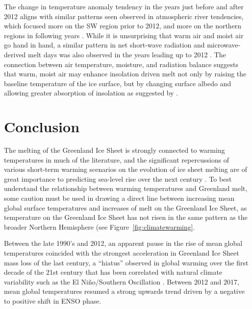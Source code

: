 \documentclass[11pt]{report}
\begin{document}
The change in temperature anomaly tendency in the years just before and after 2012 aligns with similar patterns seen observed in atmospheric river tendencies, which focused more on the SW region prior to 2012, and more on the northern regions in following years \cite[][]{mattingly2018}. While it is unsurprising that warm air and moist air go hand in hand, a similar pattern in net short-wave radiation and microwave-derived melt days was also observed in the years leading up to 2012 \cite[][]{angelen2014}. The connection between air temperature, moisture, and radiation balance suggests that warm, moist air may enhance insolation driven melt not only by raising the baseline temperature of the ice surface, but by changing surface albedo and allowing greater absorption of insolation as suggested by \cite[][]{box2012}.
%



\section{Conclusion}
The melting of the Greenland Ice Sheet is strongly connected to warming temperatures in much of the literature, and the significant repercussions of various short-term warming scenarios on the evolution of ice sheet melting are of great importance to predicting sea-level rise over the next century \cite[][]{hahn2018,pattyn2018,ruckamp2018}. To best understand the relationship between warming temperatures and Greenland melt, some caution must be used in drawing a direct line between increasing mean global surface temperatures and increases of melt on the Greenland Ice Sheet, as temperature on the Greenland Ice Sheet has not risen in the same pattern as the broader Northern Hemisphere (see Figure~\ref{fig:climatewarming}. 

Between the late 1990's and 2012, an apparent pause in the rise of mean global temperatures coincided with the strongest acceleration in Greenland Ice Sheet mass loss of the last century, a ``hiatus'' observed in global warming over the first decade of the 21st century that has been correlated with natural climate variability such as the El Ni\~{n}o/Southern Oscillation \cite[][]{kosaka2013,angelen2014,bevis2019}. Between 2012 and 2017, mean global temperatures resumed a strong upwards trend driven by a negative to positive shift in ENSO phase.
\end{document}
